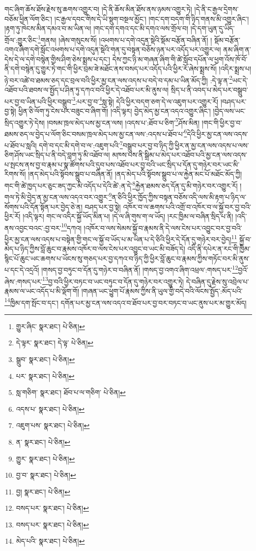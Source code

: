 གང་ཞིག་ཆོས་ཐོས་རྗེས་སུ་ཆགས་འགྱུར་བ། །དེ་ནི་ཆོས་མིན་ཐོས་ནས་ཉམས་འགྱུར་ཏེ། །དེ་ནི་ང་རྒྱལ་དྲེགས་བཅོམ་ཕྱིན་ལོག་ཅིང་། །ང་རྒྱལ་དབང་གིས་དེ་ཡི་སྡུག་བསྔལ་མྱོང་། །གང་དག་བདག་གི་ཉིད་གནས་མི་འགྱུར་ཞིང་། །རྟག་ཏུ་ཁེངས་མིན་དམའ་བ་མ་ཡིན་ལ། །གང་དག་དགའ་དང་མི་དགའ་ལས་གྲོལ་བ། །དེ་དག་ཡུན་དུ་ཡིད་གྲོལ་:གྱུར་ཅིང་\footnote{གྱུར་ཞིང་  སྣར་ཐང་།  པེ་ཅིན། }གནས། །ཞེས་གསུངས་སོ། །འཕགས་པ་དགེ་འདུན་སྡེའི་སྡོམ་བརྩོན་བཞིན་ནོ། །
སྡོམ་བརྩོན་འགའ་ཞིག་དགེ་སློང་འཕགས་པ་དགེ་འདུན་སྡེའི་གན་དུ་བསྟན་བཅོས་ཉན་པར་འདོད་པར་འགྱུར་ལ། ནམ་ཞིག་ན་དེས་དེ་ལ་དགེ་བསྙེན་གྱིས་ཤིག་ཅེས་སྨྲས་པ་དང་། དེས་ཀྱང་ཉི་མ་གཞན་ཞིག་གི་ཚེ་སློབ་དཔོན་ལ་ཕྱག་འོས་ཁོ་བོ་ནི་དགེ་བསྙེན་དུ་གྱུར་ཏེ་གང་གི་ཕྱིར་བྲམ་ཟེ་མཐོང་ནས་བསད་པར་འདོད་པའི་ཕྱིར་རོ་ཞེས་སྨྲས་སོ། །འདིར་སྨྲས་པ། ཉེ་བར་འཚེ་བ་ཐམས་ཅད་དང་བྲལ་བའི་ཕྱིར་མྱ་ངན་ལས་འདས་པ་བདེ་བ་དམ་པ་ཡིན་མོད་ཀྱི། :དེ་ལྟ་ན་\footnote{དེ་ལྟར་  སྣར་ཐང་། དེ་ལྟ་  པེ་ཅིན། }ཡང་དེ་འཐོབ་པའི་ཐབས་ལ་སྤྱོད་པ་ཤིན་ཏུ་དཀའ་བའི་ཕྱིར་དེ་འཐོབ་པར་མི་ནུས་ལ། སྲིད་པ་ནི་འབད་པ་མེད་པར་བསྒྲུབ་པར་བྱ་བ་ཡིན་པའི་ཕྱིར་བསྒྲུབ་\footnote{སྒྲུབ་  སྣར་ཐང་།  པེ་ཅིན། }:པར་བྱ་བ་\footnote{པར་  སྣར་ཐང་།  པེ་ཅིན། }སླ་སྟེ། དེའི་ཕྱིར་བདག་ཅག་དེ་ལ་འཇུག་པར་འགྱུར་རོ། །བཤད་པར་བྱ་སྟེ། ཕྱིན་ཅི་ལོག་ཏུ་ངེས་པར་བཟུང་བ་ཞིག་གོ། །འདི་ལྟར། བྱེད་མེད་མྱ་ངན་འདའ་འགྱུར་ཞིང་། །བྱེད་ལས་ཡང་སྲིད་འགྱུར་ཏེ་དེས། །བསམ་ཁྲལ་མེད་པས་མྱ་ངན་ལས། །འདས་པ་:ཐོབ་པ་ཅིག་\footnote{སླ་གཅིག་  སྣར་ཐང་། ཐོབ་པ་ལ་གཅིག་  པེ་ཅིན། }ཤོས་མིན། །གང་གི་ཕྱིར་བྱ་བ་ཐམས་ཅད་ལ་བྱེད་པ་ལོག་ཅིང་བསམ་ཁྲལ་མེད་པས་མྱ་ངན་ལས་:འདས་པ་ཐོབ་པ་\footnote{འདས་པ་  སྣར་ཐང་།  པེ་ཅིན། }དེའི་ཕྱིར་མྱ་ངན་ལས་འདས་པ་ཐོབ་པ་སླའི། དགེ་བ་དང་མི་དགེ་བ་ལ་:འཇུག་པའི་\footnote{འཇུག་པས་  སྣར་ཐང་།  པེ་ཅིན། }བསྒྲུབ་པར་བྱ་བ་ཉིད་ཀྱི་ཕྱིར་ན་མྱ་ངན་ལས་འདས་པ་ལས་ཅིག་ཤོས་ཡང་སྲིད་པ་ནི་བདེ་བླག་ཏུ་མི་འཐོབ་ལ། མཁས་པས་ནི་སྒྲིམ་པ་མེད་པར་འཐོབ་པའི་མྱ་ངན་ལས་འདས་པ་སྤངས་ནས་བྱ་བ་རྣམ་པ་སྣ་ཚོགས་པའི་དུབ་པས་འཐོབ་པར་བྱ་བའི་ཡང་སྲིད་པ་དོན་དུ་གཉེར་བར་ཡང་མི་རིགས་སོ། །ནད་མེད་པའི་སྟོབས་སྒྲུབ་པ་བཞིན་ནོ། །ནད་མེད་པའི་སྟོབས་སྒྲུབ་པ་ལ་རྐྱེན་མང་པོ་མཐོང་མོད་ཀྱི། གང་གི་ཚེ་ཁྱད་པར་ཅུང་ཟད་ཀྱང་མི་འདོད་པ་དེའི་ཚེ་:ན་དེ་\footnote{ན་  སྣར་ཐང་།  པེ་ཅིན། }རྐྱེན་ཐམས་ཅད་དོན་དུ་མི་གཉེར་བར་འགྱུར་རོ། །གལ་ཏེ་མི་བྱེད་ན་མྱ་ངན་ལས་འདའ་བར་འགྱུར་\footnote{གྱུར་  སྣར་ཐང་།  པེ་ཅིན། }ན་ཅིའི་ཕྱིར་ཁྱོད་ཀྱིས་བསྟན་བཅོས་འདི་ལས་མི་རྟག་པ་ཉིད་ལ་སོགས་པའི་དོན་སྟོན་པར་བྱེད་ཅེ་ན། བཤད་པར་བྱ་སྟེ། འཁོར་བ་ལ་ཆགས་པའི་འགྲོ་བ་འཁོར་བ་ལ་སྐྱོ་བར་བྱ་བའི་ཕྱིར་རོ། །འདི་ལྟར། གང་ལ་འདིར་སྐྱོ་ཡོད་མིན་པ། །དེ་ལ་ཞི་གུས་ག་ལ་ཡོད། །རང་ཁྱིམ་ལ་བཞིན་སྲིད་པ་ནི། །འདི་ནས་འབྱང་བའང་:བྱ་བར་\footnote{བྱ་བ་  སྣར་ཐང་།  པེ་ཅིན། }དཀའ། །འཁོར་བ་ལས་སེམས་སྐྱོ་བ་རྣམས་ནི་དེ་ལས་ངེས་པར་འབྱུང་བར་བྱ་བའི་ཕྱིར་མྱ་ངན་ལས་འདས་པ་བསྟེན་གྱི་གང་ལ་སྐྱོ་བ་ཡོད་པ་མ་ཡིན་པ་དེ་ཅིའི་ཕྱིར་དེ་དོན་དུ་གཉེར་བར་བྱེད།\footnote{བྱ།  སྣར་ཐང་།  པེ་ཅིན། } སྐྱོ་བ་མེད་པ་ཉིད་ཀྱིས་བློ་ཆུང་བ་རྣམས་འཁོར་བ་ལས་ངེས་པར་འབྱུང་བ་ཡང་མི་བཟོད་དེ། འདི་ནི་དཔེར་ན་རང་གི་ཁྱིམ་སྙིང་པོ་ཆུང་ཡང་ཆགས་པ་ཡོངས་སུ་གཅད་པར་བྱ་དཀའ་བ་ཉིད་ཀྱི་ཕྱིར་བློ་ཆུང་བ་རྣམས་ཀྱིས་གཏོང་བར་མི་ནུས་པ་དང་དེ་འདྲའོ། །གསད་བྱ་བཏུང་བ་དོན་དུ་གཉེར་བ་བཞིན་ནོ། །གསད་བྱ་འགའ་ཞིག་འཕྲལ་:གསད་པར་\footnote{བསད་པར་  སྣར་ཐང་།  པེ་ཅིན། }བྱའོ་ཞེས་:གསད་པར་\footnote{བསད་པར་  སྣར་ཐང་།  པེ་ཅིན། }བྱ་བའི་ཕྱིར་བཏང་བ་ཡང་བཏུང་བ་དོན་དུ་གཉེར་བར་འགྱུར་ཏེ། དེ་བཞིན་དུ་རྗེས་སུ་འབྲེལ་པ་རྣམས་ལ་ཡང་འདོད་པ་མི་ལྡོག་གོ། །གཞན་ཡང་ཕྱུག་པོ་རྣམས་ཀྱིས་ནི་ཡུལ་གྱི་བདེ་བའི་ལོངས་སྤྱོད་:མོད་པའི་\footnote{མེད་པའི་  སྣར་ཐང་།  པེ་ཅིན། }ཁྱིམ་དག་སྤོང་བ་དང་། དགོན་པར་མྱ་ངན་ལས་འདའ་བ་ཐོབ་པར་བྱ་བར་བཏང་བ་ཡང་ནུས་པར་མ་གྱུར་མོད། 